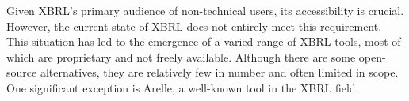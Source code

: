 Given XBRL's primary audience of non-technical users, its accessibility is crucial.
However, the current state of XBRL does not entirely meet this requirement.
This situation has led to the emergence of a varied range of XBRL tools,
most of which are proprietary and not freely available.
Although there are some open-source alternatives,
they are relatively few in number and often limited in scope.
One significant exception is Arelle\cite{arelle}, a well-known tool in the XBRL field.


